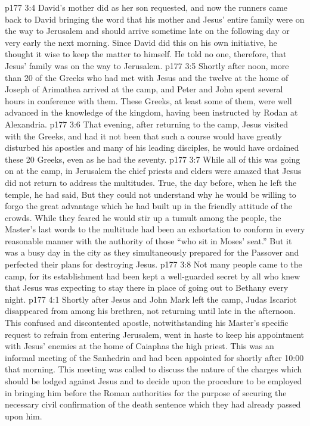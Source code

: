 \vs p177 3:4 David’s mother did as her son requested, and now the runners came back to David bringing the word that his mother and Jesus’ entire family were on the way to Jerusalem and should arrive sometime late on the following day or very early the next morning. Since David did this on his own initiative, he thought it wise to keep the matter to himself. He told no one, therefore, that Jesus’ family was on the way to Jerusalem.
\vs p177 3:5 \pc Shortly after noon, more than 20 of the Greeks who had met with Jesus and the twelve at the home of Joseph of Arimathea arrived at the camp, and Peter and John spent several hours in conference with them. These Greeks, at least some of them, were well advanced in the knowledge of the kingdom, having been instructed by Rodan at Alexandria.
\vs p177 3:6 That evening, after returning to the camp, Jesus visited with the Greeks, and had it not been that such a course would have greatly disturbed his apostles and many of his leading disciples, he would have ordained these 20 Greeks, even as he had the seventy.
\vs p177 3:7 \pc While all of this was going on at the camp, in Jerusalem the chief priests and elders were amazed that Jesus did not return to address the multitudes. True, the day before, when he left the temple, he had said,  But they could not understand why he would be willing to forgo the great advantage which he had built up in the friendly attitude of the crowds. While they feared he would stir up a tumult among the people, the Master’s last words to the multitude had been an exhortation to conform in every reasonable manner with the authority of those “who sit in Moses’ seat.” But it was a busy day in the city as they simultaneously prepared for the Passover and perfected their plans for destroying Jesus.
\vs p177 3:8 \pc Not many people came to the camp, for its establishment had been kept a well\hyp{}guarded secret by all who knew that Jesus was expecting to stay there in place of going out to Bethany every night.
\vs p177 4:1 Shortly after Jesus and John Mark left the camp, Judas Iscariot disappeared from among his brethren, not returning until late in the afternoon. This confused and discontented apostle, notwithstanding his Master’s specific request to refrain from entering Jerusalem, went in haste to keep his appointment with Jesus’ enemies at the home of Caiaphas the high priest. This was an informal meeting of the Sanhedrin and had been appointed for shortly after 10:00 that morning. This meeting was called to discuss the nature of the charges which should be lodged against Jesus and to decide upon the procedure to be employed in bringing him before the Roman authorities for the purpose of securing the necessary civil confirmation of the death sentence which they had already passed upon him.

